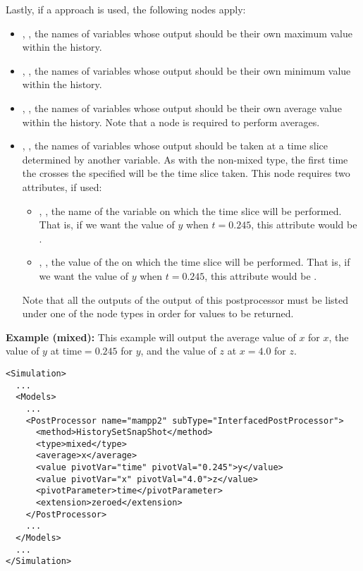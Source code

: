 Lastly, if a  approach is used, the following nodes apply:
\begin{itemize}
  \item {}, , the names of variables whose output should be their
    own maximum value within the history.
  \item {}, , the names of variables whose output should be their
    own minimum value within the history.
  \item {}, , the names of variables whose output should be their
    own average value within the history. Note that a  node is required to perform averages.
  \item {}, , the names of variables whose output should be taken
    at a time slice determined by another variable.  As with the non-mixed  type, the first
    time the  crosses the specified  will be the time slice taken.
    This node requires two attributes, if used:
    \begin{itemize}
      \item {}, , the name of the variable on which the time
        slice will be performed.  That is, if we want the value of $y$ when $t=0.245$,
        this attribute would be .
      \item {}, , the value of the  on which the time
        slice will be performed.  That is, if we want the value of $y$ when $t=0.245$,
        this attribute would be .
    \end{itemize}
  Note that all the outputs of the  output of this postprocessor must be listed under one
  of the  node types in order for values to be returned.
\end{itemize}

\textbf{Example (mixed):}
This example will output the average value of $x$ for $x$, the value of $y$ at
time$=0.245$ for $y$, and the value of $z$ at $x=4.0$ for $z$.
\begin{lstlisting}[style=XML,morekeywords={subType,debug,name,class,type}]
<Simulation>
  ...
  <Models>
    ...
    <PostProcessor name="mampp2" subType="InterfacedPostProcessor">
      <method>HistorySetSnapShot</method>
      <type>mixed</type>
      <average>x</average>
      <value pivotVar="time" pivotVal="0.245">y</value>
      <value pivotVar="x" pivotVal="4.0">z</value>
      <pivotParameter>time</pivotParameter>
      <extension>zeroed</extension>
    </PostProcessor>
    ...
  </Models>
  ...
</Simulation>
\end{lstlisting}


